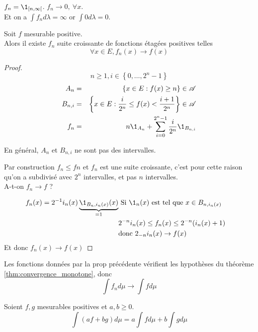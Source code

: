 \begin{example}
	$f_n = \1_{[n, \infty[}$. $f_n \to 0, \ \forall x $.\\
	Et on a  $\int f_n d\lambda = \infty$ or $\int 0 d\lambda = 0$.
\end{example}

\begin{prop}
	Soit $f$ mesurable positive.\\
	Alors il existe $f_n$ suite croissante de fonctions étagées positives telles
	$$\forall x \in E, f_n(x) \to f(x)$$
\end{prop}


\begin{proof} %
	$$n \geq 1, i \in \left\{0, \dots, 2^n - 1\right\}$$
	\begin{eqnarray*}
		A_{n} &=& \left\{ x \in E : f(x) \geq n \right\} \in \triA \\
		B_{n,i} &=& \left\{ x \in E : \frac{i}{2^n} \leq f(x) < \frac{i+1}{2^n} \right\} \in \triA \\
		f_n & = & n \1_{A_n} + \sum_{i=0}^{2^n - 1} \frac{i}{2^n} \1_{B_{n,i}}
	\end{eqnarray*}

	En général, $A_n$ et $B_{n,i}$ ne sont pas des intervalles.

	Par construction $f_n \leq fn$ et $f_n$ est une suite croissante, c'est pour cette raison qu'on a subdivisé avec $2^n$ intervalles, et pas $n$ intervalles.\\
	A-t-on $f_n \to f$ ?

	\begin{eqnarray*}
		f_n(x) =  2^{-1} i_n(x)\underbrace{\1_{B_n,i_n(x)}(x)}_{=1} &\text{ Si } \1_n(x) \text{ est tel que } x \in B_{n,i_n(x)} & \\
		& 2^{-n}i_n(x) \leq f_n(x) \leq 2^{-n}(i_n(x) + 1) &\\
		& \text{donc } 2_{-n}i_n(x) \to f(x) &
	\end{eqnarray*}
	Et donc $f_n(x) \to f(x)$
\end{proof}

\begin{remarque}
	Les fonctions données par la prop précédente vérifient les hypothèses du théorème \ref{thm:convergence_monotone}, donc
	$$ \int f_n d\mu \to \int f d\mu $$
\end{remarque}


\begin{prop}[Linéarité]
	Soient $f,g$ mesurables positives et $a, b\geq 0$.
	$$ \int (af + bg) d\mu = a\int f d\mu + b\int g d\mu $$
\end{prop}


